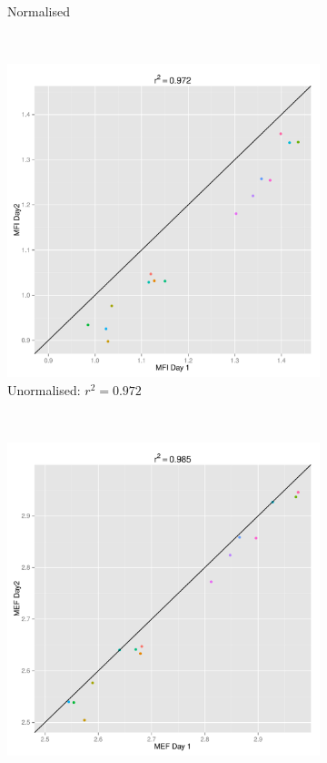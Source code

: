 \begin{figure}[ht]
\begin{subfigure}[b]{.4\textwidth}
    \caption{Normalised}
\end{subfigure}
~
\begin{subfigure}[b]{.4\textwidth}
    \centering
    \includegraphics[scale=.3]{figures/CD25-MFI-repeatability.pdf}
    \caption{Unormalised: $r^2=0.972$}
\end{subfigure}
~
\begin{subfigure}[b]{.4\textwidth}
    \centering
    \includegraphics[scale=.3]{figures/CD25-MFI-beads-normalised.pdf}

\end{subfigure}
\end{figure}
